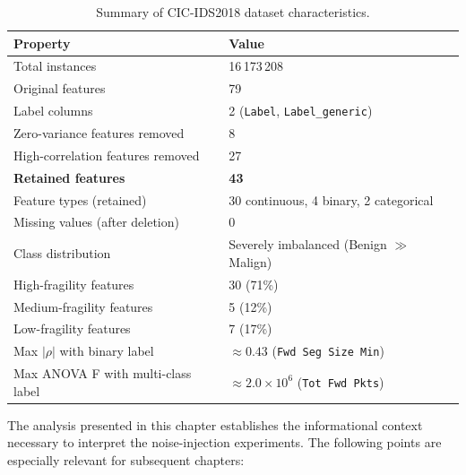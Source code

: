 \begin{table}[htbp]
  \centering
  \caption{Summary of CIC-IDS2018 dataset characteristics.}
  \label{tab:dataset-summary}
  \begin{tabular}{ll}
    \toprule
    \textbf{Property} & \textbf{Value} \\
    \midrule
    Total instances               & 16\,173\,208 \\
    Original features             & 79 \\
    Label columns                 & 2 (\texttt{Label}, \texttt{Label\_generic}) \\
    Zero-variance features removed & 8 \\
    High-correlation features removed & 27 \\
    \textbf{Retained features}    & \textbf{43} \\
    \midrule
    Feature types (retained)      & 30 continuous, 4 binary, 2 categorical \\
    Missing values (after deletion) & 0 \\
    Class distribution            & Severely imbalanced (Benign $\gg$ Malign) \\
    \midrule
    High-fragility features       & 30 (71\%) \\
    Medium-fragility features     & 5 (12\%) \\
    Low-fragility features        & 7 (17\%) \\
    \midrule
    Max $|\rho|$ with binary label & $\approx 0.43$ (\texttt{Fwd Seg Size Min}) \\
    Max ANOVA F with multi-class label & $\approx 2.0\times10^6$ (\texttt{Tot Fwd Pkts}) \\
    \bottomrule
  \end{tabular}
\end{table}

The analysis presented in this chapter establishes the informational context
necessary to interpret the noise-injection experiments.  The following points
are especially relevant for subsequent chapters:

